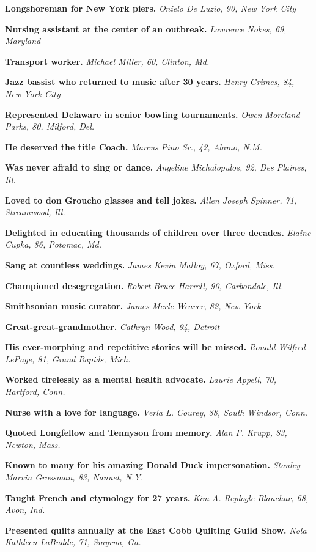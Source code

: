 \textbf{Longshoreman for New York piers.} \emph{Onielo De Luzio, 90, New
York City}

\textbf{Nursing assistant at the center of an outbreak.} \emph{Lawrence
Nokes, 69, Maryland}

\textbf{Transport worker.} \emph{Michael Miller, 60, Clinton, Md.}

\textbf{Jazz bassist who returned to music after 30 years.} \emph{Henry
Grimes, 84, New York City}

\textbf{Represented Delaware in senior bowling tournaments.} \emph{Owen
Moreland Parks, 80, Milford, Del.}

\textbf{He deserved the title Coach.} \emph{Marcus Pino Sr., 42, Alamo,
N.M.}

\textbf{Was never afraid to sing or dance.} \emph{Angeline Michalopulos,
92, Des Plaines, Ill.}

\textbf{Loved to don Groucho glasses and tell jokes.} \emph{Allen Joseph
Spinner, 71, Streamwood, Ill.}

\textbf{Delighted in educating thousands of children over three
decades.} \emph{Elaine Cupka, 86, Potomac, Md.}

\textbf{Sang at countless weddings.} \emph{James Kevin Malloy, 67,
Oxford, Miss.}

\textbf{Championed desegregation.} \emph{Robert Bruce Harrell, 90,
Carbondale, Ill.}

\textbf{Smithsonian music curator.} \emph{James Merle Weaver, 82, New
York}

\textbf{Great-great-grandmother.} \emph{Cathryn Wood, 94, Detroit}

\textbf{His ever-morphing and repetitive stories will be missed.}
\emph{Ronald Wilfred LePage, 81, Grand Rapids, Mich.}

\textbf{Worked tirelessly as a mental health advocate.} \emph{Laurie
Appell, 70, Hartford, Conn.}

\textbf{Nurse with a love for language.} \emph{Verla L. Courey, 88,
South Windsor, Conn.}

\textbf{Quoted Longfellow and Tennyson from memory.} \emph{Alan F.
Krupp, 83, Newton, Mass.}

\textbf{Known to many for his amazing Donald Duck impersonation.}
\emph{Stanley Marvin Grossman, 83, Nanuet, N.Y.}

\textbf{Taught French and etymology for 27 years.} \emph{Kim A. Replogle
Blanchar, 68, Avon, Ind.}

\textbf{Presented quilts annually at the East Cobb Quilting Guild Show.}
\emph{Nola Kathleen LaBudde, 71, Smyrna, Ga.}

